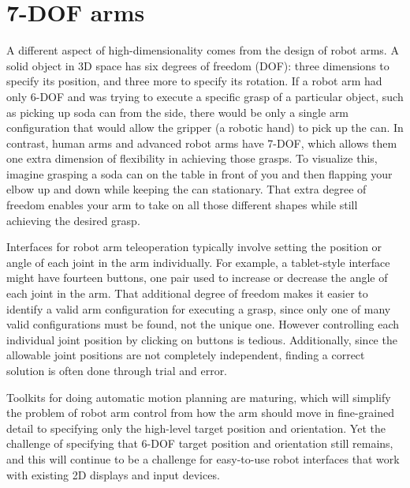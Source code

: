 \documentclass[10pt,twocolumn]{article}
\begin{document}
\section{7-DOF arms}

A different aspect of high-dimensionality comes from the design of robot arms. A solid object in 3D space has six degrees of freedom (DOF): three dimensions to specify its position, and three more to specify its rotation. If a robot arm had only 6-DOF and was trying to execute a specific grasp of a particular object, such as picking up soda can from the side, there would be only a single arm configuration that would allow the gripper (a robotic hand) to pick up the can. In contrast, human arms and advanced robot arms have 7-DOF, which allows them one extra dimension of flexibility in achieving those grasps. To visualize this, imagine grasping a soda can on the table in front of you and then flapping your elbow up and down while keeping the can stationary. That extra degree of freedom enables your arm to take on all those different shapes while still achieving the desired grasp.

Interfaces for robot arm teleoperation typically involve setting the position or angle of each joint in the arm individually. For example, a tablet-style interface might have fourteen buttons, one pair used to increase or decrease the angle of each joint in the arm. That additional degree of freedom makes it easier to identify a valid arm configuration for executing a grasp, since only one of many valid configurations must be found, not the unique one.  However controlling each individual joint position by clicking on buttons is tedious. Additionally, since the allowable joint positions are not completely independent, finding a correct solution is often done through trial and error.

Toolkits for doing automatic motion planning are maturing, which will simplify the problem of robot arm control from how the arm should move in fine-grained detail to specifying only the high-level target position and orientation. Yet the challenge of specifying that 6-DOF target position and orientation still remains, and this will continue to be a challenge for easy-to-use robot interfaces that work with existing 2D displays and input devices.


\end{document}
